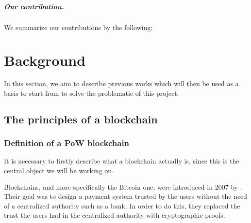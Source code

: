 \documentclass[11pt]{report}
\begin{document}
        \paragraph{Our contribution.} We summarize our contributions by the following:
        

    \chapter{Background}
        In this section, we aim to describe previous works which will then be used as a basis to start from to solve the problematic of this project.
        \section{The principles of a blockchain}
            \subsection{Definition of a PoW blockchain}
                It is necessary to firstly describe what a blockchain actually is, since this is the central object we will be working on.
                
                Blockchains, and more specifically the Bitcoin one, were introduced in 2007 by \citeauthor{Bitcoin} \cite{Bitcoin}. Their goal was to design a payment system trusted by the users without the need of a centralized authority such as a bank. In order to do this, they replaced the trust the users had in the centralized authority with cryptographic proofs.
                
\end{document}
